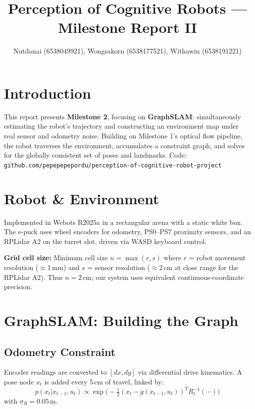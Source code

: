 \documentclass[8pt,a4paper,twocolumn]{article}
\title{Perception of Cognitive Robots --- Milestone Report II}
\author{Nutdanai (6538049921), Wongsakorn (6538177521), Withawin (6538191221)}
\date{}
\begin{document}
\setlength{\droptitle}{-20pt}
\maketitle
\vspace{-10pt}

\section{Introduction}

This report presents \textbf{Milestone 2}, focusing on \textbf{GraphSLAM}: simultaneously estimating the robot's trajectory and constructing an environment map under real sensor and odometry noise. Building on Milestone 1's optical flow pipeline, the robot traverses the environment, accumulates a constraint graph, and solves for the globally consistent set of poses and landmarks. Code: \texttt{\small github.com/pepepepepordu/perception-of-cognitive-robot-project}

\section{Robot \& Environment}

Implemented in Webots R2025a in a rectangular arena with a static white box. The e-puck uses wheel encoders for odometry, PS0--PS7 proximity sensors, and an RPLidar A2 on the turret slot, driven via WASD keyboard control.

\textbf{Grid cell size:} Minimum cell size $n = \max(r,s)$ where $r$ = robot movement resolution ($\approx$1\,mm) and $s$ = sensor resolution ($\approx$2\,cm at close range for the RPLidar A2). Thus $n = 2$\,cm; our system uses equivalent continuous-coordinate precision.

\section{GraphSLAM: Building the Graph}

\subsection{Odometry Constraint}
Encoder readings are converted to $[dx,dy]$ via differential drive kinematics. A pose node $x_t$ is added every 5\,cm of travel, linked by:
\[
p(x_t|x_{t-1},u_t) \propto \exp\!\bigl(-\tfrac{1}{2}(x_t-g(x_{t-1},u_t))^T R_t^{-1}(\cdots)\bigr)
\]
with $\sigma_R = 0.05$\,m.
\end{document}
